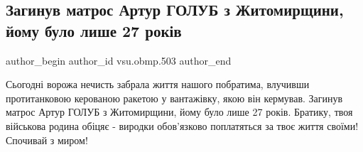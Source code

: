  
 
 
 
 
 
\subsection{Загинув матрос Артур ГОЛУБ з Житомирщини, йому було лише 27 років}
\label{sec:12_09_2021.fb.vsu.obmp.503.1.vojna_artur_golub_smert}
 
\ifcmt
 author_begin
   author_id vsu.obmp.503
 author_end
\fi

Сьогодні ворожа нечисть забрала життя нашого побратима, влучивши протитанковою
керованою ракетою у вантажівку, якою він кермував. Загинув матрос Артур ГОЛУБ з
Житомирщини, йому було лише 27 років.  Братику, твоя військова родина обіцяє -
виродки обов'язково поплатяться за твоє життя своїми! Спочивай з миром!



